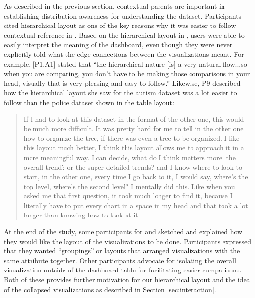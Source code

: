 \par As described in the previous section, contextual parents are important in establishing distribution-awareness for understanding the dataset. Participants cited hierarchical layout as one of the key reasons why it was easier to follow contextual reference in \system. Based on the hierarchical layout in \system, users were able to easily interpret the meaning of the dashboard, even though they were never explicitly told what the edge connections between the visualizations meant. For example, [P1.A1] stated that ``the hierarchical nature [is] a very natural flow...so when you are comparing, you don't have to be making those comparisons in your head, visually that is very pleasing and easy to follow.'' %
Likewise, P9 described how the hierarchical layout she saw for the autism dataset was a lot easier to follow than the police dataset shown in the table layout:
\begin{quote}
If I had to look at this dataset in the format of the other one, this would be much more difficult. It was pretty hard for me to tell in the other one how to organize the tree, if there was even a tree to be organized. I like this layout much better, I think this layout allows me to approach it in a more meaningful way. I can decide, what do I think matters more: the overall trend? or the super detailed trends? and I know where to look to start, in the other one, every time I go back to it, I would say, where's the top level, where's the second level? I mentally did this. Like when you asked me that first question, it took much longer to find it, because I literally have to put every chart in a space in my head and that took a lot longer than knowing how to look at it.
\end{quote}
At the end of the study, some participants for \BFS and \cluster sketched and explained how they would like the layout of the visualizations to be done. Participants expressed that they wanted ``groupings'' or layouts that arranged visualizations with the same attribute together. Other participants advocate for isolating the overall visualization outside of the dashboard table for facilitating easier comparisons. Both of these provides further motivation for our hierarchical layout and the idea of the collapsed visualizations as described in Section \ref{sec:interaction}.
